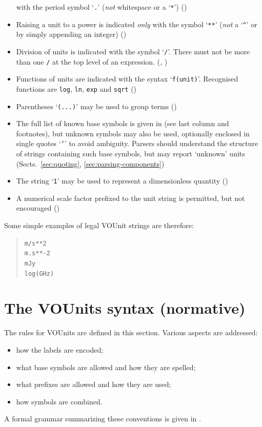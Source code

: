 \documentclass[11pt,a4paper]{ivoa}
\newcommand{\unit}[1]{\texttt{\small\color{orange}#1}}
\newcommand{\unitstyle}{\small\color{orange}}
\begin{document}
\begin{itemize}
      with the period symbol `\unit{.}'
      ({\em not\/} whitespace or a `{\unitstyle\verb|*|}')
      ()
\item Raising a unit to a power is indicated {\em only\/} with the symbol
      `{\unitstyle\verb|**|}'
      ({\em not\/} a `{\unitstyle\verb|^|}'
      or by simply appending an integer)
      ()
\item Division of units is indicated with the symbol `\unit{/}'.
      There must not be more than one \unit{/}
      at the top level of an expression.
      (, )
\item Functions of units are indicated with the syntax `\unit{f(unit)}'.
      Recognised functions are
      \unit{log}, \unit{ln}, \unit{exp} and \unit{sqrt}
      ()
\item Parentheses `\unit{(...)}' may be used to group terms
      ()
\item The full list of known base symbols is given in
       (see last column and footnotes),
      but unknown symbols may also be used,
      optionally enclosed in single quotes `\unit{'}' to avoid ambiguity.
      Parsers should understand the structure of strings containing
      such base symbols, but may report `unknown' units
      (Sects.\ \ref{sec:quoting}, \ref{sec:parsing-components})
\item The string `\unit{1}' may be used to represent a dimensionless quantity
      ()
\item A numerical scale factor prefixed to the unit string is permitted,
      but not encouraged
      ()
\end{itemize}
Some simple examples of legal VOUnit strings are therefore:
\begin{quote}
  \unit{m/s**2} \\
  \unit{m.s**-2} \\
  \unit{mJy} \\
  \unit{log(GHz)} \\
\end{quote}

\section{The VOUnits syntax (normative)\label{sec:proposal}}

The rules for VOUnits are defined in this section.
Various aspects are addressed:
\begin{itemize}
\item how the labels are encoded;
\item what base symbols are allowed and how they are spelled;
\item what prefixes are allowed and how they are used;
\item how symbols are combined.
\end{itemize}
A formal grammar summarizing these conventions is given
in .
\end{document}
